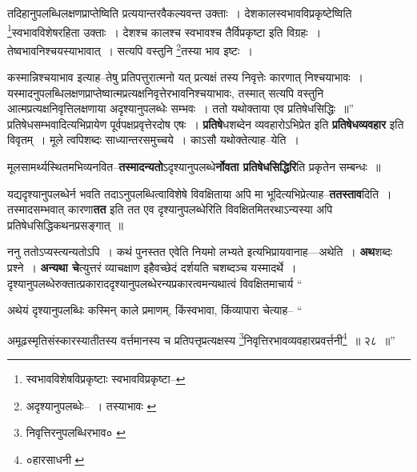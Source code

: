 \documentclass[article,12pt,a4paper]{memoir}
\begin{document}
	तदिहानुपलब्धिलक्षणप्राप्तेष्विति प्रत्ययान्तरवैकल्यवन्त उक्ताः । देशकालस्वभावविप्रकृष्टेष्विति \footnote{स्वभावविशेषविप्रकृष्टाः \cite{dp-msA} \cite{dp-edP} \cite{dp-edH} \cite{dp-edE} \cite{dp-edN} स्वभावविप्रकृष्टा--\cite{dp-msC}}\-स्वभावविशेषरहिता उक्ताः । देशश्च कालश्च स्वभावश्च तैर्विप्रकृष्टा इति विग्रहः । तेष्वभावनिश्चयस्याभावात् । सत्यपि वस्तुनि \footnote{अदृश्यानुपलब्धेः--\cite{dp-msD-n} । तस्याभावः \cite{dp-edP} \cite{dp-edH} \cite{dp-edE} \cite{dp-edN}}\-तस्या भाव इष्टः । 
	  
	कस्मान्निश्चयाभाव इत्याह--तेषु प्रतिपत्तुरात्मनो यत् प्रत्यक्षं तस्य निवृत्तेः कारणात् निश्चयाभावः । यस्मादनुपलब्धिलक्षणप्राप्तेष्वात्मप्रत्यक्षनिवृत्तेरभावनिश्चयाभावः, तस्मात् सत्यपि वस्तुनि आत्मप्रत्यक्षनिवृत्तिलक्षणाया अदृश्यानुपलब्धेः सम्भवः । ततो यथोक्ताया एव प्रतिषेधसिद्धिः ॥” प्रतिषेधसम्भवादित्यभिप्रायेण पूर्वपक्षप्रवृत्तेरदोष एषः । \textbf{प्रतिषे}धशब्देन व्यवहारोऽभिप्रेत इति \textbf{प्रतिषेधव्यवहार} इति विवृतम् । मूले त्वपिशब्दः साध्यान्तरसमुच्चये । काऽसौ यथोक्तेत्याह--येति ।
	\pend
      

	  \pstart मूलसामर्थ्यस्थितमभिव्यनवित--\textbf{तस्मादन्यतो}ऽदृश्यानुपलब्धे\textbf{र्नोवता प्रतिषेधसिद्धिरि}ति प्रकृतेन सम्बन्धः ॥
	\pend
      

	  \pstart यद्यदृश्यानुपलब्धेर्न भवति तदाऽनुपलब्धित्वाविशेषे विवक्षिताया अपि मा भूदित्यभिप्रेत्याह--\textbf{ततस्ताव}दिति । तस्मादसम्भवात् कारणा\textbf{तत} इति तत एव दृश्यानुपलब्धेरिति विवक्षितमितरथाऽन्यस्या अपि प्रतिषेधसिद्धिकथनप्रसङ्गात् ॥
	\pend
      

	  \pstart ननु ततोऽप्यस्त्यन्यतोऽपि । कथं पुनस्तत एवेति नियमो लभ्यते इत्यभिप्रायवानाह—अथेति । \textbf{अथ}शब्दः प्रश्ने । \textbf{अन्यथा चे}त्युत्तरं व्याचक्षाण इहैवच्छेदं दर्शयति चशब्दञ्च यस्मादर्थे । दृश्यानुपलब्धेरुक्तात्प्रकाराददृश्यानुपलब्धेरन्यप्रकारत्वमन्यथात्वं विवक्षितमाचार्य  \leavevmode{} “
	  
	अथेयं दृश्यानुपलब्धिः कस्मिन् काले प्रमाणम्, किंस्वभावा, किंव्यापारा चेत्याह-- “
	  
	अमूढस्मृतिसंस्कारस्यातीतस्य वर्त्तमानस्य च प्रतिपत्तृप्रत्यक्षस्य \footnote{निवृत्तिरनुपलब्धिरभाव० \cite{dp-msC} \cite{dp-msD}}\-निवृत्तिरभावव्यवहारप्रवर्त्तनी\footnote{०हारसाधनी \cite{dp-msB} \cite{dp-msC} \cite{dp-msD} \cite{dp-edP} \cite{dp-edH} \cite{dp-edE} \cite{dp-edN}} ॥ २८ ॥” 
	  
\end{document}
